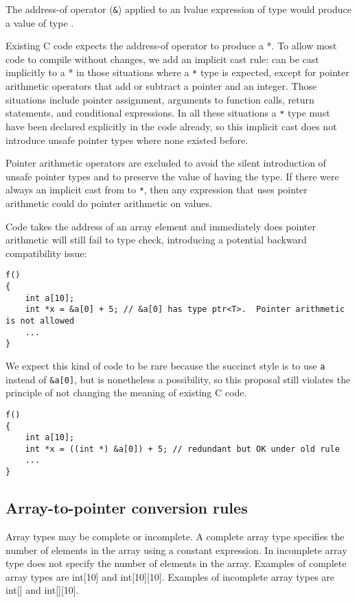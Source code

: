 The address-of operator (\texttt{\&}) applied to an lvalue expression of
type  would produce a value of type
\ptrT.

Existing C code expects the address-of operator to produce a  *.
To allow most code to compile without changes, we add an implicit cast
rule: \ptrT can be cast
implicitly to a  * in those situations where a 
\texttt{*} type is expected, except for pointer arithmetic operators
that add or subtract a pointer and an integer. Those situations include
pointer assignment, arguments to function calls, return statements, and
conditional expressions. In all these situations a  \texttt{*}
type must have been declared explicitly in the code already, so this
implicit cast does not introduce unsafe pointer types where none existed
before.

Pointer arithmetic operators are excluded to avoid the silent
introduction of unsafe pointer types and to preserve the value of having
the \ptrT type. If
there were always an implicit cast from \ptrT to  \texttt{*},
then any expression that uses pointer arithmetic could do pointer
arithmetic on \ptrT
values.

Code takes the address of an array element and immediately does pointer
arithmetic will still fail to type check, introducing a potential
backward compatibility issue:
\begin{verbatim}
f()
{
    int a[10];
    int *x = &a[0] + 5; // &a[0] has type ptr<T>.  Pointer arithmetic is not allowed
    ...
}
\end{verbatim}

We expect this kind of code to be rare because the succinct style is to
use \texttt{a} instead of \texttt{\&a[0]}, but is nonetheless a
possibility, so this proposal still violates the principle of not
changing the meaning of existing C code.

\begin{verbatim}
f()
{
    int a[10];
    int *x = ((int *) &a[0]) + 5; // redundant but OK under old rule
    ...
}
\end{verbatim}

\subsection{Array-to-pointer conversion rules}

Array types may be complete or incomplete. A complete array type
specifies the number of elements in the array using a constant
expression. In incomplete array type does not specify the number of
elements in the array. Examples of complete array types are int[10]
and int[10][10]. Examples of incomplete array types are
int[] and int[][10].

